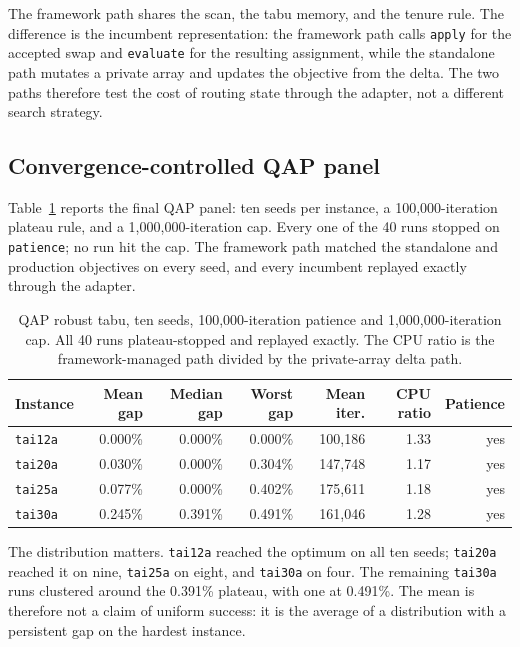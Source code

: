 \documentclass[11pt]{article}
\begin{document}
The framework path shares the scan, the tabu memory, and the tenure rule. The difference is the
incumbent representation: the framework path calls \texttt{apply} for the accepted swap and
\texttt{evaluate} for the resulting assignment, while the standalone path mutates a private array
and updates the objective from the delta. The two paths therefore test the cost of routing state
through the adapter, not a different search strategy.

\subsection{Convergence-controlled QAP panel}

Table~\ref{tab:qap-converged} reports the final QAP panel: ten seeds per instance, a 100,000-iteration
plateau rule, and a 1,000,000-iteration cap. Every one of the 40 runs stopped on \texttt{patience};
no run hit the cap. The framework path matched the standalone and production objectives on every
seed, and every incumbent replayed exactly through the adapter.

\begin{table}[t]
\centering
\caption{QAP robust tabu, ten seeds, 100,000-iteration patience and 1,000,000-iteration cap. All
40 runs plateau-stopped and replayed exactly. The CPU ratio is the framework-managed path divided by
the private-array delta path.}
\label{tab:qap-converged}
\small
\begin{tabular}{lrrrrrr}
\toprule
Instance & Mean gap & Median gap & Worst gap & Mean iter. & CPU ratio & Patience \\
\midrule
\texttt{tai12a} & 0.000\% & 0.000\% & 0.000\% & 100,186 & 1.33 & yes \\
\texttt{tai20a} & 0.030\% & 0.000\% & 0.304\% & 147,748 & 1.17 & yes \\
\texttt{tai25a} & 0.077\% & 0.000\% & 0.402\% & 175,611 & 1.18 & yes \\
\texttt{tai30a} & 0.245\% & 0.391\% & 0.491\% & 161,046 & 1.28 & yes \\
\bottomrule
\end{tabular}
\end{table}

The distribution matters. \texttt{tai12a} reached the optimum on all ten seeds; \texttt{tai20a}
reached it on nine, \texttt{tai25a} on eight, and \texttt{tai30a} on four. The remaining
\texttt{tai30a} runs clustered around the 0.391\% plateau, with one at 0.491\%. The mean is therefore
not a claim of uniform success: it is the average of a distribution with a persistent gap on the
hardest instance.
\end{document}
